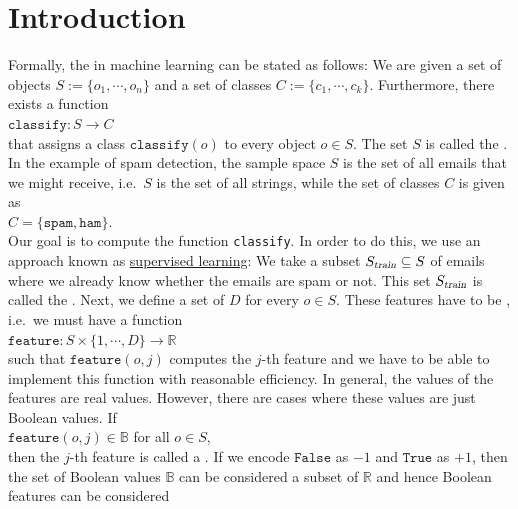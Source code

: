 \section{Introduction}
Formally, the   
in machine learning can be stated as follows:  We are given a
set of objects $S := \{ o_1, \cdots, o_n \}$ and a set of classes $C := \{ c_1, \cdots, c_k \}$.  Furthermore, there exists a function 
\\[0.2cm]
\hspace*{1.3cm}
$\mathtt{classify}: S \rightarrow C$
\\[0.2cm]
that assigns a class $\texttt{classify}(o)$ to every object $o \in S$.  The set $S$ is called the .
In the example of spam detection, the sample space $S$ is the set of all emails that we might receive, i.e.~$S$
is the set of all strings, while the set of classes $C$ is given as
\\[0.2cm]
\hspace*{1.3cm}
$C = \{ \mathtt{spam}, \mathtt{ham} \}$.
\\[0.2cm]
Our goal is to compute the function \texttt{classify}.  In order to do this, we use an approach known as
\href{https://en.wikipedia.org/wiki/Supervised_learning}{supervised learning}:  We take a subset $S_\textsl{train} \subseteq S$ of
emails where we already know whether the emails are spam or not.  This set $S_\textsl{train}$ is called the
. 
Next, we define a set of $D$  for every $o \in S$.  These features have to be ,
i.e.~we must have a function
\\[0.2cm]
\hspace*{1.3cm}
$\mathtt{feature}: S \times \{ 1, \cdots, D \} \rightarrow \mathbb{R}$ 
\\[0.2cm]
such that $\mathtt{feature}(o, j)$ computes the $j$-th feature and we have to be able to implement
this function with reasonable efficiency.  In general, the values of the features are real values.
However, there are cases where these values are just 
Boolean values.  If
\\[0.2cm]
\hspace*{1.3cm}
$\texttt{feature}(o, j) \in \mathbb{B}$ \quad for all $o \in S$,
\\[0.2cm]
then the $j$-th feature is called a .  
If we encode $\mathtt{False}$ as $-1$ and $\mathtt{True}$ as
$+1$, then the set of Boolean values $\mathbb{B}$ can be considered a subset of $\mathbb{R}$ and hence Boolean features can be considered
